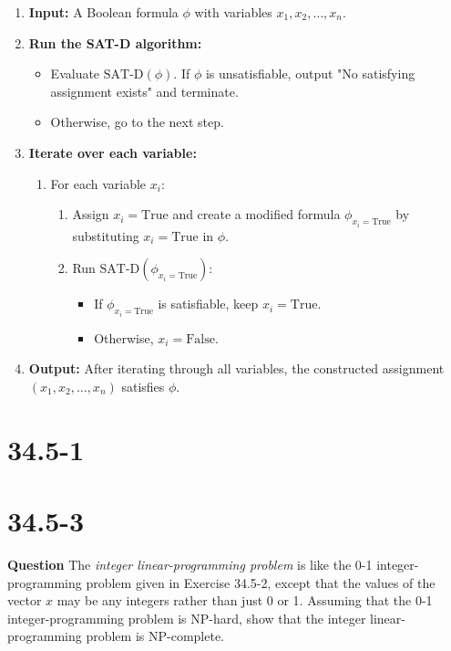 \documentclass[12pt]{article}
\begin{document}
\begin{enumerate}
    \item \textbf{Input:} A Boolean formula \( \phi \) with variables \( x_1, x_2, \ldots, x_n \).
    \item \textbf{Run the SAT-D algorithm:}
    \begin{itemize}
        \item Evaluate \( \text{SAT-D}(\phi) \). If \( \phi \) is unsatisfiable, output "No satisfying assignment exists" and terminate.
        \item Otherwise, go to the next step.
    \end{itemize}
    \item \textbf{Iterate over each variable:}
    \begin{enumerate}
        \item For each variable \( x_i \):
        \begin{enumerate}
            \item Assign \( x_i = \text{True} \) and create a modified formula \( \phi_{x_i=\text{True}} \) by substituting \( x_i = \text{True} \) in \( \phi \).
            \item Run \( \text{SAT-D}(\phi_{x_i=\text{True}}) \):
            \begin{itemize}
                \item If \( \phi_{x_i=\text{True}} \) is satisfiable, keep \( x_i = \text{True} \).
                \item Otherwise, \( x_i = \text{False} \).
            \end{itemize}
        \end{enumerate}
    \end{enumerate}
    \item \textbf{Output:} After iterating through all variables, the constructed assignment \( (x_1, x_2, \ldots, x_n) \) satisfies \( \phi \).
\end{enumerate}

\section{34.5-1}

\section{34.5-3}
\textbf{Question}
The \textit{integer linear-programming problem} is like the 0-1 integer-programming problem given in Exercise 34.5-2, except that the values of the vector $x$ may be any integers rather than just 0 or 1. Assuming that the 0-1 integer-programming problem is NP-hard, show that the integer linear-programming problem is NP-complete.
\end{document}
